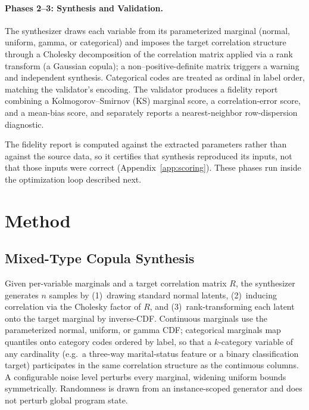 \documentclass[letterpaper]{article} %
\begin{document}
\paragraph{Phases 2--3: Synthesis and Validation.}
The synthesizer draws each variable from its parameterized marginal (normal,
uniform, gamma, or categorical) and imposes the target correlation structure
through a Cholesky decomposition of the correlation matrix applied via a rank
transform (a Gaussian copula); a non--positive-definite matrix triggers a
warning and independent synthesis. Categorical codes are treated as ordinal in
label order, matching the validator's encoding. The validator produces a
fidelity report combining a Kolmogorov--Smirnov (KS) marginal score,
a correlation-error score, and a mean-bias score, and separately reports a
nearest-neighbor row-dispersion diagnostic.

The fidelity report is computed against the extracted parameters rather than
against the source data, so it certifies that synthesis reproduced its inputs,
not that those inputs were correct (Appendix~\ref{app:scoring}). These phases run inside the optimization loop
described next.

\section{Method}

\subsection{Mixed-Type Copula Synthesis}
Given per-variable marginals and a target correlation matrix $R$, the
synthesizer generates $n$ samples by (1)~drawing standard normal latents,
(2)~inducing correlation via the Cholesky factor of $R$, and (3)~rank-transforming
each latent onto the target marginal by inverse-CDF. Continuous marginals use
the parameterized normal, uniform, or gamma CDF; categorical marginals map
quantiles onto category codes ordered by label, so that a $k$-category variable
of any cardinality (e.g.\ a three-way marital-status feature or a binary
classification target) participates in the same correlation structure as the
continuous columns. A configurable noise level perturbs every marginal,
widening uniform bounds symmetrically. Randomness is drawn from an
instance-scoped generator and does not perturb global program state.
\end{document}
